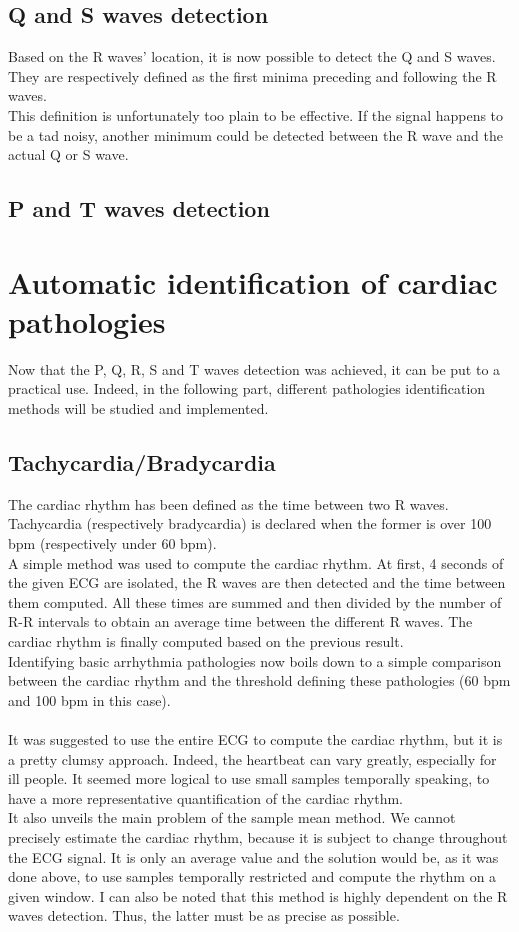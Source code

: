 \documentclass[11pt]{report}
\begin{document}
	\section{Q and S waves detection}
		Based on the R waves' location, it is now possible to detect the Q and S waves. They are respectively defined as the first minima preceding and following the R waves.\\
		This definition is unfortunately too plain to be effective. If the signal happens to be a tad noisy, another minimum could be detected between the R wave and the actual Q or S wave. 
	\section{P and T waves detection}



\chapter{Automatic identification of cardiac pathologies}
	Now that the P, Q, R, S and T waves detection was achieved, it can be put to a practical use. Indeed, in the following part, different pathologies identification methods will be studied and implemented.
	\section{Tachycardia/Bradycardia}
		The cardiac rhythm has been defined as the time between two R waves. Tachycardia (respectively bradycardia) is declared when the former is over 100 bpm (respectively under 60 bpm).\\
		A simple method was used to compute the cardiac rhythm. At first, 4 seconds of the given ECG are isolated, the R waves are then detected and the time between them computed. All these times are summed and then divided by the number of R-R intervals to obtain an average time between the different R waves. The cardiac rhythm is finally computed based on the previous result. \\
		Identifying basic arrhythmia pathologies now boils down to a simple comparison between the cardiac rhythm and the threshold defining these pathologies (60 bpm and 100 bpm in this case).\\
		\\
		It was suggested to use the entire ECG to compute the cardiac rhythm, but it is a pretty clumsy approach. Indeed, the heartbeat can vary greatly, especially for ill people. It seemed more logical to use small samples temporally speaking, to have a more representative quantification of the cardiac rhythm.\\
		It also unveils the main problem of the sample mean method. We cannot precisely estimate the cardiac rhythm, because it is subject to change throughout the ECG signal. It is only an average value and the solution would be, as it was done above, to use samples temporally restricted and compute the rhythm on a given window.
		I can also be noted that this method is highly dependent on the R waves detection. Thus, the latter must be as precise as possible.
\end{document}
